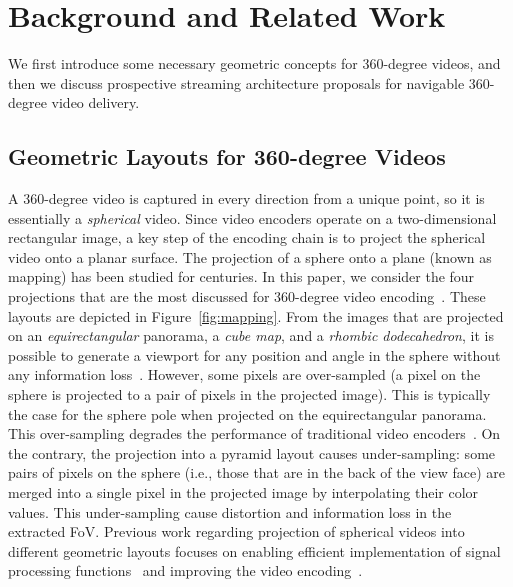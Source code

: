 \section{Background and Related Work}
\label{sec:related}

We first introduce some necessary geometric concepts for 360-degree
videos, and then we discuss prospective streaming architecture
proposals for navigable 360-degree video delivery.

\subsection{Geometric Layouts for 360-degree Videos}

A 360-degree video is captured in every direction from a unique point,
so it is essentially a \emph{spherical} video. Since video encoders
operate on a two-dimensional rectangular image, a key step of the
encoding chain is to project the spherical video onto a planar
surface. The projection of a sphere onto a plane (known as mapping)
has been studied for centuries. In this paper, we consider the four
projections that are the most discussed for 360-degree video
encoding~\cite{yu_framework_2015}. These layouts are depicted in
Figure~\ref{fig:mapping}.
From the images that are projected on an \textit{equirectangular}
panorama, a \textit{cube map}, and a \textit{rhombic dodecahedron}, it
is possible to generate a viewport for any position and angle in the
sphere without any information loss~\cite{Ng2005, fu_rhombic_2009}.
However, some pixels are over-sampled (a pixel on the sphere is
projected to a pair of pixels in the projected image). This is
typically the case for the sphere pole when projected on the
equirectangular panorama. This over-sampling degrades the performance
of traditional video encoders~\cite{wojciechowski_h.264_2006,
yu_framework_2015}. On the contrary, the projection into a pyramid
layout causes under-sampling: some pairs of pixels on the sphere
(i.e., those that are in the back of the view face) are merged into a
single pixel in the projected image by interpolating their color
values. This under-sampling cause distortion and information loss in
the extracted FoV. Previous work regarding projection of spherical
videos into different geometric layouts focuses on enabling efficient
implementation of signal processing
functions~\cite{kazhdan_metric-aware_2010} and improving the video
encoding~\cite{tosic_low_2009}.

